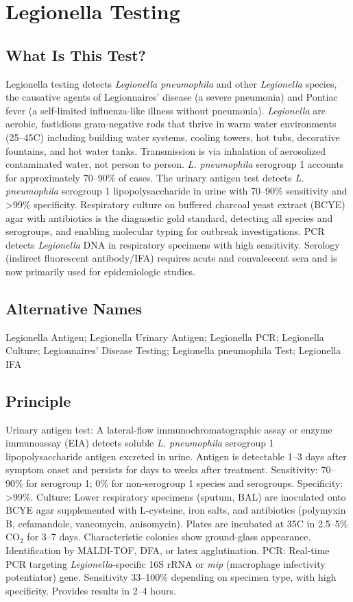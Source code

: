 \chapter{Legionella Testing}

\section*{What Is This Test?}
Legionella testing detects \textit{Legionella pneumophila} and other \textit{Legionella} species, the causative agents of Legionnaires' disease (a severe pneumonia) and Pontiac fever (a self-limited influenza-like illness without pneumonia). \textit{Legionella} are aerobic, fastidious gram-negative rods that thrive in warm water environments (25--45\textdegree{}C) including building water systems, cooling towers, hot tubs, decorative fountains, and hot water tanks. Transmission is via inhalation of aerosolized contaminated water, not person to person. \textit{L. pneumophila} serogroup 1 accounts for approximately 70--90\% of cases. The urinary antigen test detects \textit{L. pneumophila} serogroup 1 lipopolysaccharide in urine with 70--90\% sensitivity and >99\% specificity. Respiratory culture on buffered charcoal yeast extract (BCYE) agar with antibiotics is the diagnostic gold standard, detecting all species and serogroups, and enabling molecular typing for outbreak investigations. PCR detects \textit{Legionella} DNA in respiratory specimens with high sensitivity. Serology (indirect fluorescent antibody/IFA) requires acute and convalescent sera and is now primarily used for epidemiologic studies.

\section*{Alternative Names}
Legionella Antigen; Legionella Urinary Antigen; Legionella PCR; Legionella Culture; Legionnaires' Disease Testing; Legionella pneumophila Test; Legionella IFA

\section*{Principle}
Urinary antigen test: A lateral-flow immunochromatographic assay or enzyme immunoassay (EIA) detects soluble \textit{L. pneumophila} serogroup 1 lipopolysaccharide antigen excreted in urine. Antigen is detectable 1--3 days after symptom onset and persists for days to weeks after treatment. Sensitivity: 70--90\% for serogroup 1; 0\% for non-serogroup 1 species and serogroups. Specificity: >99\%. Culture: Lower respiratory specimens (sputum, BAL) are inoculated onto BCYE agar supplemented with L-cysteine, iron salts, and antibiotics (polymyxin B, cefamandole, vancomycin, anisomycin). Plates are incubated at 35\textdegree{}C in 2.5--5\% CO$_2$ for 3--7 days. Characteristic colonies show ground-glass appearance. Identification by MALDI-TOF, DFA, or latex agglutination. PCR: Real-time PCR targeting \textit{Legionella}-specific 16S rRNA or \textit{mip} (macrophage infectivity potentiator) gene. Sensitivity 33--100\% depending on specimen type, with high specificity. Provides results in 2--4 hours.

